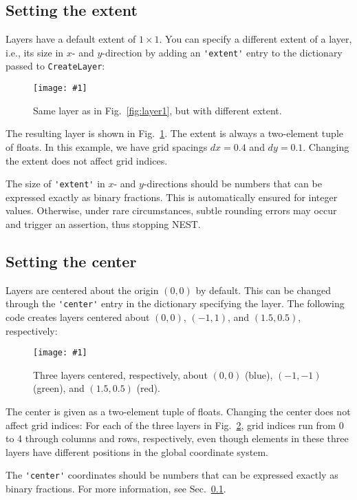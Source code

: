 \documentclass[a4paper,12pt]{report}
\newcommand{\scriptfig}[4]{%
\begin{figure}
\centerline{\texttt{[image: \#1]}}
\caption[#3]{#4}
\label{fig:#1}
\end{figure}%
}
\begin{document}
\subsection{Setting the extent}\label{sec:setextent}

Layers have a default extent of $1\times 1$.
You can specify a different extent of a layer, i.e., its size in $x$- and
$y$-direction by adding an \lstinline!'extent'! entry to the
dictionary passed to \lstinline!CreateLayer!:
%

\scriptfig{layer2}{0.8}{Layer with non-standard extent}%
{Same layer as in Fig.~\ref{fig:layer1}, but with different extent.}
%
The resulting layer is shown in Fig.~\ref{fig:layer2}. The extent is
always a two-element tuple of floats. In this example, we have grid
spacings $dx=0.4$ and $dy=0.1$. Changing the extent does not affect
grid indices.

The size of \lstinline!'extent'! in $x$- and $y$-directions should be 
numbers that can be expressed exactly as binary fractions. This is 
automatically ensured for integer values. Otherwise, under rare 
circumstances, subtle rounding errors may occur and trigger an 
assertion, thus stopping NEST.

\subsection{Setting the center}\label{sec:setcenter}

Layers are centered about the origin $(0,0)$ by default. This can be
changed through the \lstinline!'center'! entry in the dictionary
specifying the layer. The following code creates layers centered about
$(0,0)$, $(-1,1)$, and $(1.5,0.5)$, respectively:
%

\scriptfig{layer3}{0.8}{Layers with different centers}%
{Three layers centered, respectively, about $(0,0)$ (blue), $(-1,-1)$
  (green), and $(1.5,0.5)$ (red).}
%
The center is given as a two-element tuple of floats.
Changing the center does not affect grid indices: For each of the
three layers in Fig.~\ref{fig:layer3}, grid indices run from 0 to 4
through columns and rows, respectively, even though elements in these
three layers have different positions in the global coordinate system.

The \lstinline!'center'! coordinates should be numbers that
can be expressed exactly as binary fractions. For more information, 
see Sec.~\ref{sec:setextent}.
\end{document}
